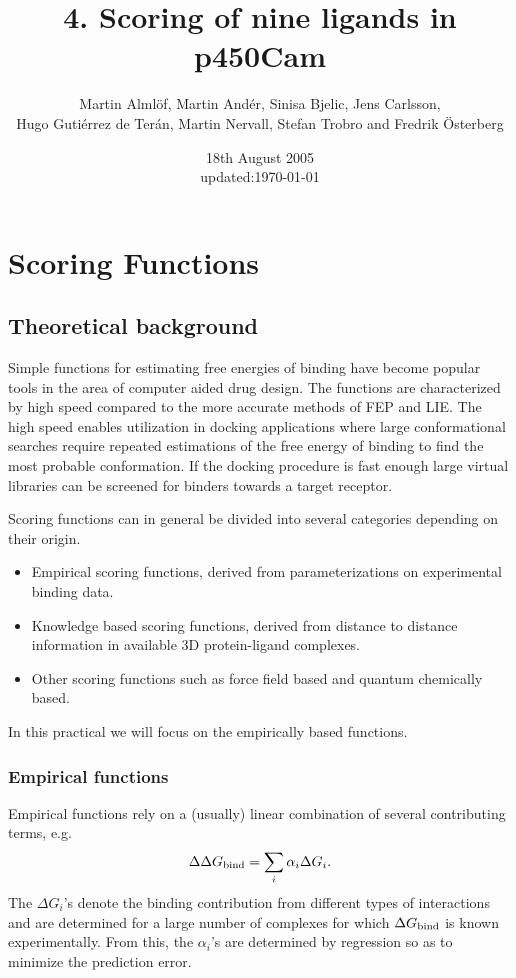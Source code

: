 \documentclass[a4paper,12pt]{article}
\title{4. Scoring of nine ligands in p450Cam}
\author{Martin Alml\"{o}f, Martin And\'er, Sinisa Bjelic, Jens Carlsson, \\ Hugo Guti\'errez de Ter\'an, Martin Nervall, Stefan Trobro and Fredrik \"{O}sterberg}
\date{18th August 2005\\ \footnotesize{updated:\today}}
\newcommand{\dGb}{\ensuremath{\Delta G_{\rm bind}}}
\begin{document}
\maketitle
\tableofcontents
\newpage
\renewcommand{\thefigure}{\arabic{figure}}

\section{Scoring Functions}

\subsection{Theoretical background}
Simple functions for estimating free energies of binding have
become popular tools in the area of computer aided drug design.
The functions are characterized by high speed compared to the more
accurate methods of FEP and LIE. The high speed enables
utilization in docking applications where large conformational
searches require repeated estimations of the free energy of
binding to find the most probable conformation. If the docking
procedure is fast enough large virtual libraries can be screened
for binders towards a target receptor.

Scoring functions can in general be divided into several
categories depending on their origin.

\begin{itemize}
\item Empirical scoring functions, derived from parameterizations on
experimental binding data.

\item Knowledge based scoring functions, derived from distance to
distance information in available 3D protein-ligand complexes.

\item Other scoring functions such as force field based and
quantum chemically based.
\end{itemize}

\noindent In this practical we will focus on the empirically based
functions.


\subsubsection{Empirical functions}
Empirical functions rely on a (usually) linear combination of
several contributing terms, e.g.
        \begin{equation} \label{emp_gen}
        \Delta \dGb = \sum_{i} \alpha_i \Delta G_{i}.
        \end{equation}
The $\Delta G_i$'s denote the binding contribution from different
types of interactions and are determined for a large number of
complexes for which {\dGb} is known experimentally. From this, the
$\alpha_i$'s are determined by regression so as to minimize the
prediction error.
\end{document}
